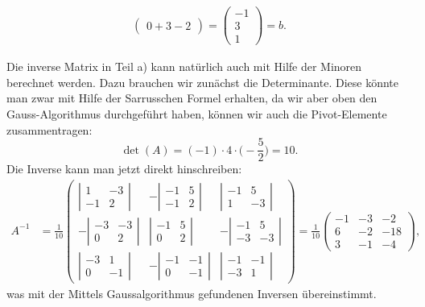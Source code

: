 \begin{loesung}
\begin{teilaufgaben}
\begin{align*}
\begin{pmatrix}
0+3-2
\end{pmatrix}
=
\begin{pmatrix}
-1\\3\\1
\end{pmatrix}
=b.
\end{align*}
\end{teilaufgaben}
Die inverse Matrix in Teil a) kann natürlich auch mit Hilfe der
Minoren berechnet werden.
Dazu brauchen wir zunächst die Determinante.
Diese könnte man zwar mit
Hilfe der Sarrusschen Formel erhalten, da wir aber oben den Gauss-Algorithmus
durchgeführt haben, können wir auch die Pivot-Elemente zusammentragen:
\[
\det(A)
=
(-1)\cdot 4\cdot \biggl(-\frac52\biggr)
=
10.
\]
Die Inverse kann man jetzt direkt hinschreiben:
\begin{align*}
A^{-1}
&=
\frac1{10}
\begin{pmatrix}
\left|\begin{matrix} 1&-3\\-1& 2\end{matrix}\right|&
-\left|\begin{matrix}-1& 5\\-1& 2\end{matrix}\right|&
\left|\begin{matrix}-1& 5\\ 1&-3\end{matrix}\right|\\
-\left|\begin{matrix}-3&-3\\ 0& 2\end{matrix}\right|&
\left|\begin{matrix}-1& 5\\ 0& 2\end{matrix}\right|&
-\left|\begin{matrix}-1& 5\\-3&-3\end{matrix}\right|\\
\left|\begin{matrix}-3& 1\\ 0&-1\end{matrix}\right|&
-\left|\begin{matrix}-1&-1\\ 0&-1\end{matrix}\right|&
\left|\begin{matrix}-1&-1\\-3& 1\end{matrix}\right|
\end{pmatrix}
=
\frac1{10}
\begin{pmatrix}
-1&-3& -2\\
 6&-2&-18\\
 3&-1& -4
\end{pmatrix},
\end{align*}
was mit der Mittels Gaussalgorithmus gefundenen Inversen übereinstimmt.
\end{loesung}

